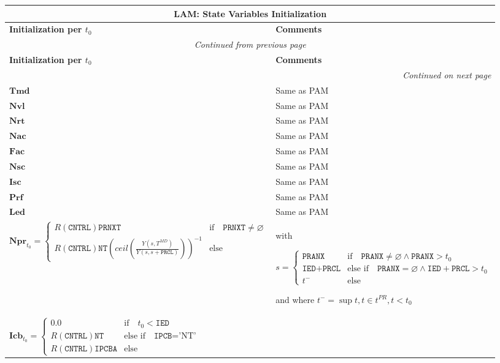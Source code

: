\documentclass[9pt,oneside]{amsart}
\newenvironment{states}[1]{
	\begin{longtable}[H]{| p{0.5\textwidth} |  p{0.45\textwidth} |}
	\multicolumn{2}{c}{\textbf{#1: State Variables Initialization}}\\
	\hline
	\textbf{Initialization per $t_0$} & \textbf{Comments} \\
	\hline
	\endfirsthead
	\multicolumn{2}{c}{\textit{Continued from previous page}} \\
	\hline
	\textbf{Initialization per $t_0$} & \textbf{Comments} \\
	\hline
	\endhead
	\hline \multicolumn{2}{r}{\textit{Continued on next page}} \\
	\endfoot
	\hline
	\endlastfoot
}{%
	\end{longtable}
}
\newcommand{\svar}[2]{\textbf{#1}_{#2}}
\newcommand{\attr}[1]{\texttt{#1}}
\newcommand{\sgn}{R(\attr{CNTRL})}
\newcommand{\yfr}[2]{Y(#1,#2)}
\newcommand{\undef}{\varnothing}
\begin{document}


\begin{states}{LAM}
	$\svar{Tmd}{}$ & Same as PAM \\
	\hline
  	$\svar{Nvl}{}$ & Same as PAM \\
	\hline
	$\svar{Nrt}{}$ & Same as PAM \\
  	\hline 
  	$\svar{Nac}{}$ & Same as PAM \\
	\hline
  	$\svar{Fac}{}$ & Same as PAM \\
  	\hline
  	$\svar{Nsc}{}$ & Same as PAM \\
  	\hline
  	$\svar{Isc}{}$ & Same as PAM \\
	\hline
  	$\svar{Prf}{}$ & Same as PAM \\
	\hline
	$\svar{Led}{}$ & Same as PAM \\
	\hline
	$\svar{Npr}{t_0} = \begin{cases} \sgn\attr{PRNXT} & \text{if}\quad \attr{PRNXT}\neq\undef \\
					\sgn\attr{NT}(ceil(\frac{\yfr{s}{T^{MD}}}{\yfr{s}{s+\attr{PRCL}}}))^{-1} & \text{else} \end{cases}$ 
		& with\par $s = \begin{cases} 
					\attr{PRANX} & \text{if}\quad \attr{PRANX}\neq\undef \land \attr{PRANX}>t_0\\
					\attr{IED}+\attr{PRCL} & \text{else if}\quad \attr{PRANX} = \undef \land \attr{IED}+\attr{PRCL}>t_0 \\
					t^- & \text{else} \end{cases}$\par
		and where $t^- = \sup{t}, t \in t^{PR}, t<t_0$ \\
	\hline
	$\svar{Icb}{t_0}= \begin{cases} 0.0 & \text{if}\quad t_0<\attr{IED} \\
					\sgn\attr{NT} & \text{else if}\quad \attr{IPCB}=\text{'NT'} \\
					\sgn\attr{IPCBA} & \text{else} \end{cases}$ & \\
	\hline
\end{states}





\end{document}
